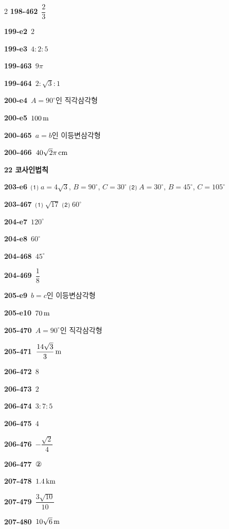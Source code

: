 \documentclass[10pt,a4paper]{article}
\begin{document}
\begin{multicols}{2}
\noindent\textbf{198-462}\ $\dfrac{2}{3}$\par
\noindent\textbf{199-e2}\ $2$\par
\noindent\textbf{199-e3}\ $4:2:5$\par
\noindent\textbf{199-463}\ $9\pi$\par
\noindent\textbf{199-464}\ $2:\sqrt{3}:1$\par
\noindent\textbf{200-e4}\ $A=90^\circ$인 직각삼각형\par
\noindent\textbf{200-e5}\ $100\mkern3mu \mathrm{m}$\par
\noindent\textbf{200-465}\ $a=b$인 이등변삼각형\par
\noindent\textbf{200-466}\ $40\sqrt{2}\pi\mkern3mu \mathrm{cm}$\par
\noindent\textbf{22 코사인법칙}\par\smallskip
\noindent\textbf{203-e6}\ ⑴ $a=4\sqrt{3}$, $B=90^\circ$, $C=30^\circ$ ⑵ $A=30^\circ$, $B=45^\circ$, $C=105^\circ$\par
\noindent\textbf{203-467}\ ⑴ $\sqrt{17}$ ⑵ $60^\circ$\par
\noindent\textbf{204-e7}\ $120^\circ$\par
\noindent\textbf{204-e8}\ $60^\circ$\par
\noindent\textbf{204-468}\ $45^\circ$\par
\noindent\textbf{204-469}\ $\dfrac{1}{8}$\par
\noindent\textbf{205-e9}\ $b=c$인 이등변삼각형\par
\noindent\textbf{205-e10}\ $70\mkern3mu \mathrm{m}$\par
\noindent\textbf{205-470}\ $A=90^\circ$인 직각삼각형\par
\noindent\textbf{205-471}\ $\dfrac{14\sqrt{3}}{3}\mkern3mu \mathrm{m}$\par
\noindent\textbf{206-472}\ $8$\par
\noindent\textbf{206-473}\ $2$\par
\noindent\textbf{206-474}\ $3:7:5$\par
\noindent\textbf{206-475}\ $4$\par
\noindent\textbf{206-476}\ $-\dfrac{\sqrt{2}}{4}$\par
\noindent\textbf{206-477}\ ②\par
\noindent\textbf{207-478}\ $1.4\mkern3mu \mathrm{km}$\par
\noindent\textbf{207-479}\ $\dfrac{3\sqrt{10}}{10}$\par
\noindent\textbf{207-480}\ $10\sqrt{6}\mkern3mu \mathrm{m}$\par

\end{multicols}
\end{document}

